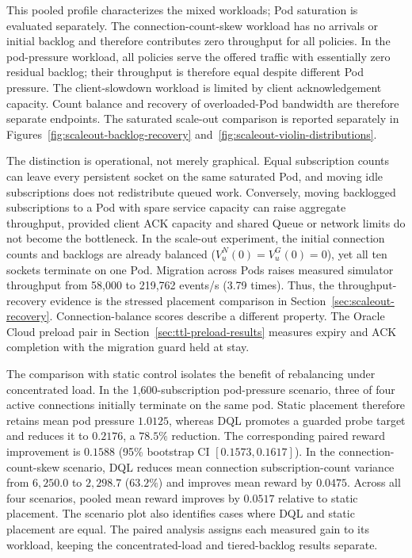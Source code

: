 This pooled profile characterizes the mixed workloads; Pod saturation is
evaluated separately. The
connection-count-skew workload has no arrivals or initial backlog and therefore
contributes zero throughput for all policies. In the pod-pressure workload,
all policies serve the offered traffic with essentially zero residual backlog;
their throughput is therefore equal despite different Pod pressure. The
client-slowdown workload is limited by client acknowledgement capacity.
Count balance and recovery of overloaded-Pod bandwidth are therefore separate
endpoints. The saturated scale-out comparison is
reported separately in Figures~\ref{fig:scaleout-backlog-recovery}
and~\ref{fig:scaleout-violin-distributions}.

The distinction is operational, not merely graphical. Equal subscription
counts can leave every persistent socket on the same saturated Pod, and moving
idle subscriptions does not redistribute queued work. Conversely, moving
backlogged subscriptions to a Pod with spare service capacity can raise
aggregate throughput, provided client ACK capacity and shared Queue or network
limits do not become the bottleneck. In the scale-out experiment, the initial
connection counts and backlogs are already balanced
($V_u^N(0)=V_u^G(0)=0$), yet all ten sockets terminate on one Pod. Migration
across Pods raises measured simulator throughput from 58,000 to 219,762 events/s
(3.79 times). Thus, the throughput-recovery evidence is the stressed placement
comparison in Section~\ref{sec:scaleout-recovery}. Connection-balance scores
describe a different property. The Oracle Cloud preload pair in
Section~\ref{sec:ttl-preload-results} measures expiry and ACK completion with
the migration guard held at stay.

The comparison with static control isolates the benefit of rebalancing under
concentrated load. In the 1,600-subscription pod-pressure scenario, three of
four active connections initially terminate on the same pod. Static placement
therefore retains mean pod pressure $1.0125$, whereas DQL promotes a guarded
probe target and reduces it to $0.2176$, a $78.5\%$ reduction. The corresponding
paired reward improvement is $0.1588$ (95\% bootstrap CI
$[0.1573,0.1617]$). In the connection-count-skew scenario, DQL reduces mean
connection subscription-count variance from $6{,}250.0$ to $2{,}298.7$
($63.2\%$) and improves mean reward by $0.0475$. Across all four scenarios,
pooled mean reward improves by $0.0517$ relative to static placement. The
scenario plot also identifies cases where DQL and static placement are equal.
The paired analysis assigns each measured gain to its workload, keeping the
concentrated-load and tiered-backlog results separate.
\FloatBarrier

